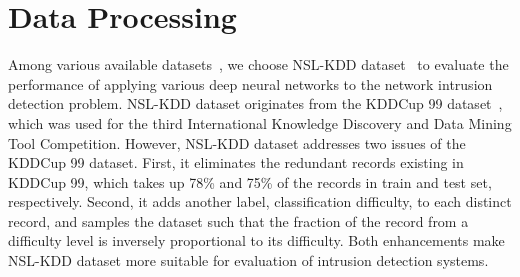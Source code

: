 \section{Data Processing}
Among various available datasets~\cite{NSL-KDD, KDDCup, DARPA},
we choose NSL-KDD dataset~\cite{NSL-KDD} to evaluate the performance of applying
various deep neural networks to the network intrusion detection problem.
NSL-KDD dataset originates from the KDDCup 99 dataset~\cite{KDDCup},
which was used for the third International Knowledge Discovery and Data Mining Tool Competition.
However, NSL-KDD dataset addresses two issues of the KDDCup 99 dataset.
First, it eliminates the redundant records existing in KDDCup 99, which takes up
78\% and 75\% of the records in train and test set, respectively.
Second, it adds another label, classification difficulty, to each distinct record,
and samples the dataset such that the fraction of the record
from a difficulty level is inversely proportional to its difficulty.
Both enhancements make NSL-KDD dataset more suitable for
evaluation of intrusion detection systems.


